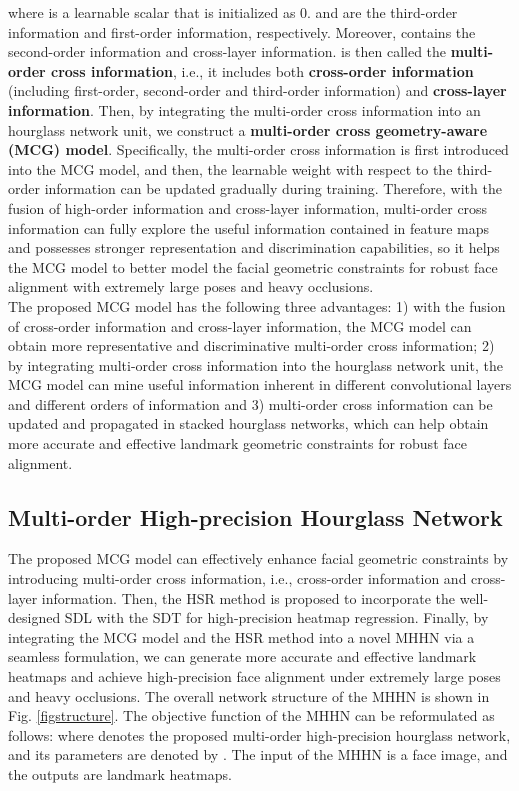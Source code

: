 \documentclass[journal]{IEEEtran}
\begin{document}
where  is a learnable scalar that is initialized as 0.  and  are the third-order information and first-order information, respectively. Moreover,  contains the second-order information and cross-layer information.  is then called the \textbf{multi-order cross information}, i.e., it includes both \textbf{cross-order information} (including first-order, second-order and third-order information) and \textbf{cross-layer information}. Then, by integrating the multi-order cross information into an hourglass network unit, we construct a \textbf{multi-order cross geometry-aware (MCG) model}. Specifically, the multi-order cross information is first introduced into the MCG model, and then, the learnable weight  with respect to the third-order information can be updated gradually during training. Therefore, with the fusion of high-order information and cross-layer information, multi-order cross information can fully explore the useful information contained in feature maps and possesses stronger representation and discrimination capabilities, so it helps the MCG model to better model the facial geometric constraints for robust face alignment with extremely large poses and heavy occlusions.
\\\indent The proposed MCG model has the following three advantages: 1) with the fusion of cross-order information and cross-layer information, the MCG model can obtain more representative and discriminative multi-order cross information; 2) by integrating multi-order cross information into the hourglass network unit, the MCG model can mine useful information inherent in different convolutional layers and different orders of information and 3) multi-order cross information can be updated and propagated in stacked hourglass networks, which can help obtain more accurate and effective landmark geometric constraints for robust face alignment.

\subsection{Multi-order High-precision Hourglass Network}
The proposed MCG model can effectively enhance facial geometric constraints by introducing multi-order cross information, i.e., cross-order information and cross-layer information. Then, the HSR method is proposed to incorporate the well-designed SDL with the SDT for high-precision heatmap regression. Finally, by integrating the MCG model and the HSR method into a novel MHHN via a seamless formulation, we can generate more accurate and effective landmark heatmaps and achieve high-precision face alignment under extremely large poses and heavy occlusions. The overall network structure of the MHHN is shown in Fig. \ref{figstructure}. The objective function of the MHHN can be reformulated as follows:
where  denotes the proposed multi-order high-precision hourglass network, and its parameters are denoted by . The input of the MHHN is a face image, and the outputs are landmark heatmaps.
\end{document}
